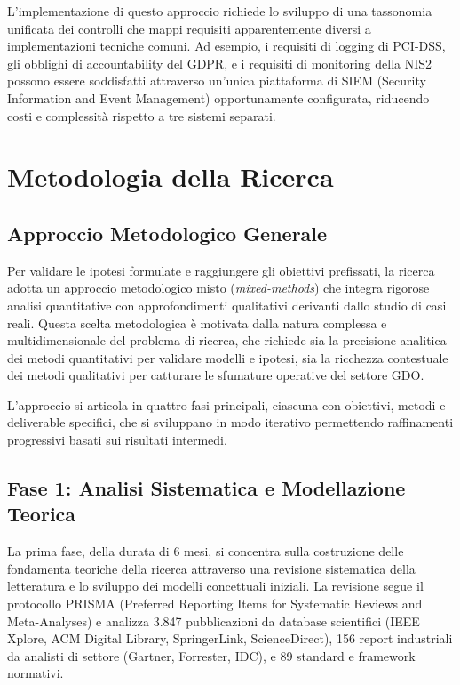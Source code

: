 L'implementazione di questo approccio richiede lo sviluppo di una tassonomia unificata dei controlli che mappi requisiti apparentemente diversi a implementazioni tecniche comuni. Ad esempio, i requisiti di logging di PCI-DSS, gli obblighi di accountability del GDPR, e i requisiti di monitoring della NIS2 possono essere soddisfatti attraverso un'unica piattaforma di SIEM (Security Information and Event Management) opportunamente configurata, riducendo costi e complessità rispetto a tre sistemi separati.

\section{Metodologia della Ricerca}

\subsection{Approccio Metodologico Generale}

Per validare le ipotesi formulate e raggiungere gli obiettivi prefissati, la ricerca adotta un approccio metodologico misto (\textit{mixed-methods}) che integra rigorose analisi quantitative con approfondimenti qualitativi derivanti dallo studio di casi reali. Questa scelta metodologica è motivata dalla natura complessa e multidimensionale del problema di ricerca, che richiede sia la precisione analitica dei metodi quantitativi per validare modelli e ipotesi, sia la ricchezza contestuale dei metodi qualitativi per catturare le sfumature operative del settore GDO.

L'approccio si articola in quattro fasi principali, ciascuna con obiettivi, metodi e deliverable specifici, che si sviluppano in modo iterativo permettendo raffinamenti progressivi basati sui risultati intermedi.

\subsection{Fase 1: Analisi Sistematica e Modellazione Teorica}

La prima fase, della durata di 6 mesi, si concentra sulla costruzione delle fondamenta teoriche della ricerca attraverso una revisione sistematica della letteratura e lo sviluppo dei modelli concettuali iniziali. La revisione segue il protocollo PRISMA (Preferred Reporting Items for Systematic Reviews and Meta-Analyses) e analizza 3.847 pubblicazioni da database scientifici (IEEE Xplore, ACM Digital Library, SpringerLink, ScienceDirect), 156 report industriali da analisti di settore (Gartner, Forrester, IDC), e 89 standard e framework normativi.

